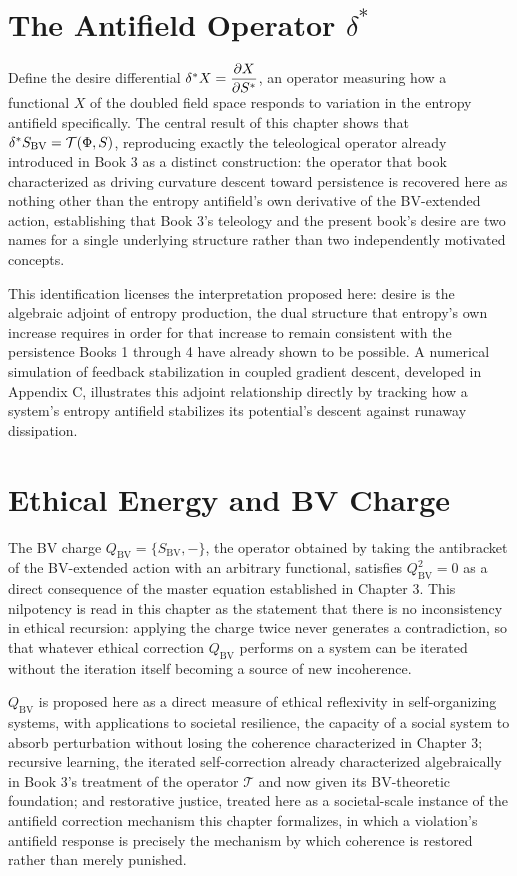 \chapter{The Antifield Operator $\delta^{*}$}

Define the desire differential $\delta^{*} X = \dfrac{\partial X}{\partial S^{*}}$, an operator measuring how a functional $X$ of the doubled field space responds to variation in the entropy antifield specifically. The central result of this chapter shows that $\delta^{*} S_{\text{BV}} = \mathcal{T}(\Phi, S)$, reproducing exactly the teleological operator already introduced in Book 3 as a distinct construction: the operator that book characterized as driving curvature descent toward persistence is recovered here as nothing other than the entropy antifield's own derivative of the BV-extended action, establishing that Book 3's teleology and the present book's desire are two names for a single underlying structure rather than two independently motivated concepts.

This identification licenses the interpretation proposed here: desire is the algebraic adjoint of entropy production, the dual structure that entropy's own increase requires in order for that increase to remain consistent with the persistence Books 1 through 4 have already shown to be possible. A numerical simulation of feedback stabilization in coupled gradient descent, developed in Appendix C, illustrates this adjoint relationship directly by tracking how a system's entropy antifield stabilizes its potential's descent against runaway dissipation.

\chapter{Ethical Energy and BV Charge}

The BV charge $Q_{\text{BV}} = \{S_{\text{BV}}, -\}$, the operator obtained by taking the antibracket of the BV-extended action with an arbitrary functional, satisfies $Q_{\text{BV}}^2 = 0$ as a direct consequence of the master equation established in Chapter 3. This nilpotency is read in this chapter as the statement that there is no inconsistency in ethical recursion: applying the charge twice never generates a contradiction, so that whatever ethical correction $Q_{\text{BV}}$ performs on a system can be iterated without the iteration itself becoming a source of new incoherence.

$Q_{\text{BV}}$ is proposed here as a direct measure of ethical reflexivity in self-organizing systems, with applications to societal resilience, the capacity of a social system to absorb perturbation without losing the coherence characterized in Chapter 3; recursive learning, the iterated self-correction already characterized algebraically in Book 3's treatment of the operator $\mathcal{T}$ and now given its BV-theoretic foundation; and restorative justice, treated here as a societal-scale instance of the antifield correction mechanism this chapter formalizes, in which a violation's antifield response is precisely the mechanism by which coherence is restored rather than merely punished.

